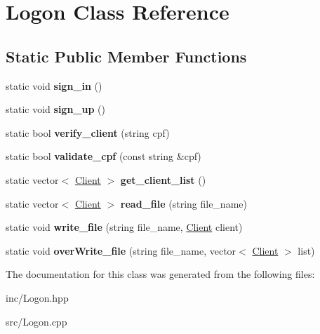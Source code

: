 \hypertarget{class_logon}{}\section{Logon Class Reference}
\label{class_logon}
\subsection*{Static Public Member Functions}
\begin{DoxyCompactItemize}
\item 
\mbox{\label{class_logon_aebfff5adecbc80681a654ed9d4d5ecf6}} 
static void {\bfseries sign\+\_\+in} ()
\item 
\mbox{\label{class_logon_a531b1b7853c47c35a4a89c56250dd650}} 
static void {\bfseries sign\+\_\+up} ()
\item 
\mbox{\label{class_logon_a8786b259d84a281e3aa0e617d29a5e8b}} 
static bool {\bfseries verify\+\_\+client} (string cpf)
\item 
\mbox{\label{class_logon_aa89a2e6fb9631562485c38b5533f0616}} 
static bool {\bfseries validate\+\_\+cpf} (const string \&cpf)
\item 
\mbox{\label{class_logon_ad2419d09493bf5da6b6ff7b9e79cc646}} 
static vector$<$ \hyperlink{class_client}{Client} $>$ {\bfseries get\+\_\+client\+\_\+list} ()
\item 
\mbox{\label{class_logon_a79e6acb6429d4bc902970a01a6827f4a}} 
static vector$<$ \hyperlink{class_client}{Client} $>$ {\bfseries read\+\_\+file} (string file\+\_\+name)
\item 
\mbox{\label{class_logon_aea874971c4eeaad12528c38e5d72b00e}} 
static void {\bfseries write\+\_\+file} (string file\+\_\+name, \hyperlink{class_client}{Client} client)
\item 
\mbox{\label{class_logon_a456f7f498f6395bbe3166b0ebde26d29}} 
static void {\bfseries over\+Write\+\_\+file} (string file\+\_\+name, vector$<$ \hyperlink{class_client}{Client} $>$ list)
\end{DoxyCompactItemize}


The documentation for this class was generated from the following files\+:\begin{DoxyCompactItemize}
\item 
inc/Logon.\+hpp\item 
src/Logon.\+cpp\end{DoxyCompactItemize}
